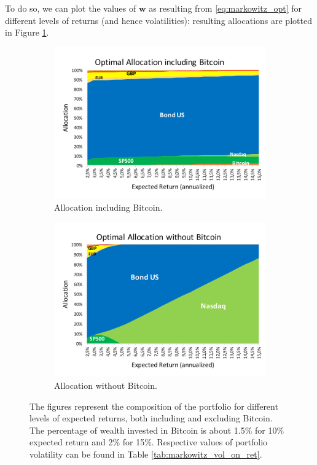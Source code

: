 To do so, we can plot the values of $\mathbf{w}$ as resulting from \eqref{eq:markowitz_opt} for different levels of returns (and hence volatilities): resulting allocations are plotted in Figure \ref{fig:markowitz_allocation}.


\begin{figure}
	\centering
\begin{subfigure}{0.8\textwidth}
	\includegraphics[width=\linewidth]{Images/markowitz_allocation}
	\caption{Allocation including Bitcoin.}
\end{subfigure}

\begin{subfigure}{0.8\textwidth}
	\centering
	\includegraphics[width=\linewidth]{Images/markowitz_allocation_no_btc}
	\caption{Allocation without Bitcoin.}
\end{subfigure}
\caption[Markowitz Optimal Allocations]{The figures represent the composition of the portfolio for different levels of expected returns, both including and excluding Bitcoin.  The percentage of wealth invested in Bitcoin is about 1.5\%  for  10\% expected return and  2\% for 15\%. Respective values of portfolio volatility can be found in Table \ref{tab:markowitz_vol_on_ret}.}
\label{fig:markowitz_allocation}
\end{figure}





